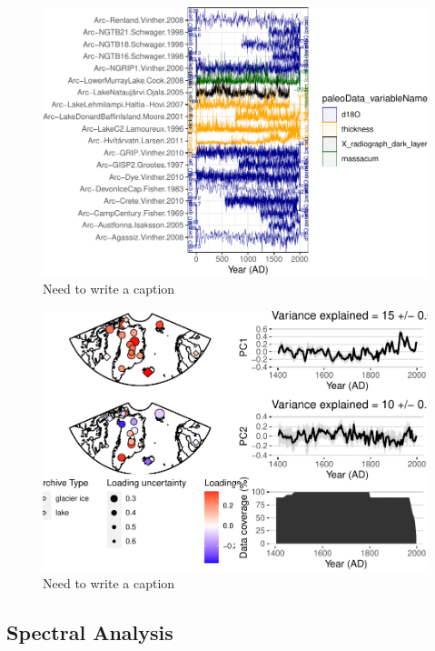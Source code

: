 \documentclass[gc, manuscript]{copernicus}
\begin{document}
\begin{figure}
\centering
\includegraphics{geoChronR-paper_files/figure-latex/unnamed-chunk-12-1.pdf}
\caption{\label{fig:unnamed-chunk-12}Need to write a caption}
\end{figure}

\begin{figure}
\centering
\includegraphics{geoChronR-paper_files/figure-latex/unnamed-chunk-14-1.pdf}
\caption{\label{fig:unnamed-chunk-14}Need to write a caption}
\end{figure}

\subsection{Spectral Analysis}
\end{document}
